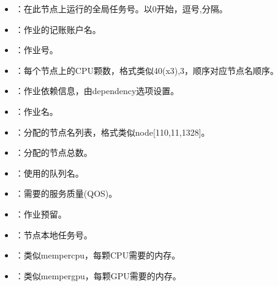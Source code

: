 \documentclass[a4paper,12pt,english]{sphinxmanual}
\begin{document}
\begin{itemize}
\item {} 
\sphinxAtStartPar
{}：在此节点上运行的全局任务号。以0开始，逗号,分隔。

\item {} 
\sphinxAtStartPar
{}：作业的记账账户名。

\item {} 
\sphinxAtStartPar
{}：作业号。

\item {} 
\sphinxAtStartPar
{}：每个节点上的CPU颗数，格式类似40(x3),3，顺序对应节点名顺序。

\item {} 
\sphinxAtStartPar
{}：作业依赖信息，由\sphinxhyphen{}\sphinxhyphen{}dependency选项设置。

\item {} 
\sphinxAtStartPar
{}：作业名。

\item {} 
\sphinxAtStartPar
{}：分配的节点名列表，格式类似node{[}1\sphinxhyphen{}10,11,13\sphinxhyphen{}28{]}。

\item {} 
\sphinxAtStartPar
{}：分配的节点总数。

\item {} 
\sphinxAtStartPar
{}：使用的队列名。

\item {} 
\sphinxAtStartPar
{}：需要的服务质量(QOS)。

\item {} 
\sphinxAtStartPar
{}：作业预留。

\item {} 
\sphinxAtStartPar
{}：节点本地任务号。

\item {} 
\sphinxAtStartPar
{}：类似\sphinxhyphen{}\sphinxhyphen{}mem\sphinxhyphen{}per\sphinxhyphen{}cpu，每颗CPU需要的内存。

\item {} 
\sphinxAtStartPar
{}：类似\sphinxhyphen{}\sphinxhyphen{}mem\sphinxhyphen{}per\sphinxhyphen{}gpu，每颗GPU需要的内存。


\end{itemize}
\end{document}
